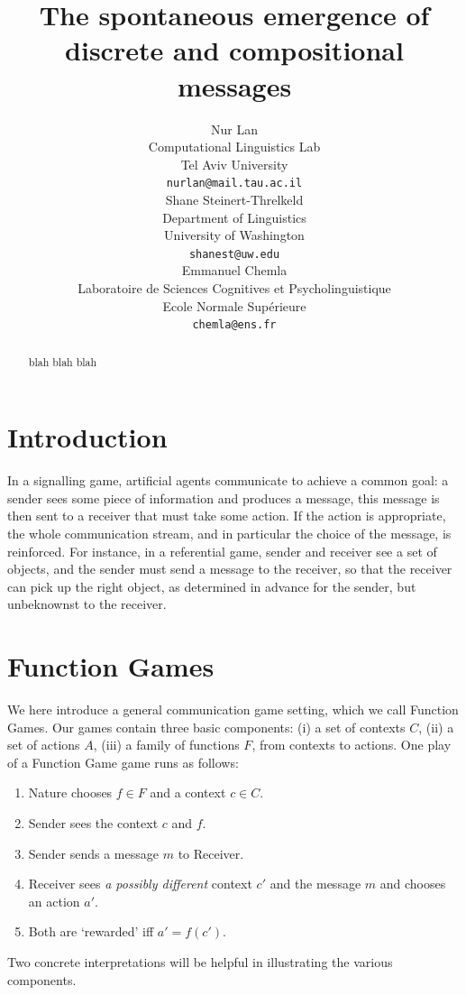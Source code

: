 \documentclass[11pt,a4paper]{article}
\title{The spontaneous emergence of discrete and compositional messages}
\author{Nur Lan \\
  Computational Linguistics Lab \\
  Tel Aviv University \\
  \texttt{nurlan@mail.tau.ac.il} \\\And
  Shane Steinert-Threlkeld \\
  Department of Linguistics \\
  University of Washington \\
  \texttt{shanest@uw.edu} \\\And
  Emmanuel Chemla \\
  Laboratoire de Sciences Cognitives et Psycholinguistique \\
  Ecole Normale Sup\'erieure \\
  \texttt{chemla@ens.fr}}
\date{}
\newcommand{\nbSST}[1]{{\leavevmode\color{violet}{\scriptsize#1}}}
\begin{document}
\maketitle

\begin{abstract}
	blah blah blah
\end{abstract}

\section{Introduction}

In a signalling game, artificial agents communicate to achieve a common goal: a sender sees some piece of information and produces a message, this message is then sent to a receiver that must take some action. If the action is appropriate, the whole communication stream, and in particular the choice of the message, is reinforced. For instance, in a referential game, sender and receiver see a set of objects, and the sender must send a message to the receiver, so that the receiver can pick up the right object, as determined in advance for the sender, but unbeknownst to the receiver. 

\section{Function Games}

We here introduce a general communication game setting, which we call Function Games.  Our games contain three basic components: (i) a set of contexts $C$, (ii) a set of actions $A$, (iii) a family of functions $F$, from contexts to actions.  One play of a Function Game game runs as follows:
\begin{enumerate}
	\item Nature chooses $f \in F$ and a context $c \in C$.
	\item Sender sees the context $c$ and $f$. \nbSST{I like f(c) here, but f is a bit more appropriate.  What do you all think? Nur: Given the situation, f is the only choice, no?}
	\item Sender sends a message $m$ to Receiver.
	\item Receiver sees \emph{a possibly different} context $c'$ and the message $m$ and chooses an action $a'$.
	\item Both are `rewarded' iff $a' = f(c')$.
\end{enumerate}
Two concrete interpretations will be helpful in illustrating the various components.
\end{document}
